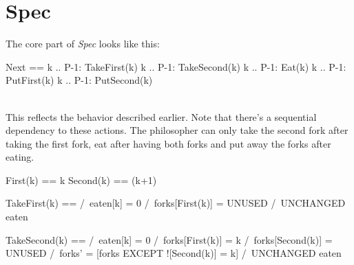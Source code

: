 \section{Spec}

The core part of \textit{Spec} looks like this: 
\\
\begin{tla}
Next ==
    \/ \E k .. P-1:
        TakeFirst(k)
    \/ \E k .. P-1:
        TakeSecond(k)
    \/ \E k .. P-1:
        Eat(k)
    \/ \E k .. P-1:
        PutFirst(k)
    \/ \E k .. P-1:
        PutSecond(k)
\end{tla}
\begin{tlatex}
%
%
%
%
%
%
%
%
%
%
%
\end{tlatex}
\\

This reflects the behavior described earlier. Note that there's a sequential
dependency to these actions. The philosopher can only take the second fork after
taking the first fork, eat after having both forks and put away the forks after
eating.
\\

\begin{tla}

First(k) == k
Second(k) == (k+1)%

TakeFirst(k) == 
    /\ eaten[k] = 0
    /\ forks[First(k)] = UNUSED
    /\ UNCHANGED eaten

TakeSecond(k) ==
    /\ eaten[k] = 0
    /\ forks[First(k)] = k
    /\ forks[Second(k)] = UNUSED
    /\ forks' = [forks EXCEPT ![Second(k)] = k]
    /\ UNCHANGED eaten
\end{tla}
\begin{tlatex}
%
%
\@pvspace{8.0pt}%
%
%
%
%
\@pvspace{8.0pt}%
%
%
%
%
%
\end{tlatex}
\\

